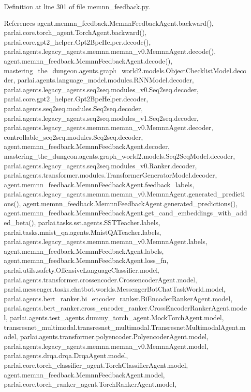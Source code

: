 Definition at line 301 of file memnn\+\_\+feedback.\+py.



References agent.\+memnn\+\_\+feedback.\+Memnn\+Feedback\+Agent.\+backward(), parlai.\+core.\+torch\+\_\+agent.\+Torch\+Agent.\+backward(), parlai.\+core.\+gpt2\+\_\+helper.\+Gpt2\+Bpe\+Helper.\+decode(), parlai.\+agents.\+legacy\+\_\+agents.\+memnn.\+memnn\+\_\+v0.\+Memnn\+Agent.\+decode(), agent.\+memnn\+\_\+feedback.\+Memnn\+Feedback\+Agent.\+decode(), mastering\+\_\+the\+\_\+dungeon.\+agents.\+graph\+\_\+world2.\+models.\+Object\+Checklist\+Model.\+decoder, parlai.\+agents.\+language\+\_\+model.\+modules.\+R\+N\+N\+Model.\+decoder, parlai.\+agents.\+legacy\+\_\+agents.\+seq2seq.\+modules\+\_\+v0.\+Seq2seq.\+decoder, parlai.\+core.\+gpt2\+\_\+helper.\+Gpt2\+Bpe\+Helper.\+decoder, parlai.\+agents.\+seq2seq.\+modules.\+Seq2seq.\+decoder, parlai.\+agents.\+legacy\+\_\+agents.\+seq2seq.\+modules\+\_\+v1.\+Seq2seq.\+decoder, parlai.\+agents.\+legacy\+\_\+agents.\+memnn.\+memnn\+\_\+v0.\+Memnn\+Agent.\+decoder, controllable\+\_\+seq2seq.\+modules.\+Seq2seq.\+decoder, agent.\+memnn\+\_\+feedback.\+Memnn\+Feedback\+Agent.\+decoder, mastering\+\_\+the\+\_\+dungeon.\+agents.\+graph\+\_\+world2.\+models.\+Seq2\+Seq\+Model.\+decoder, parlai.\+agents.\+legacy\+\_\+agents.\+seq2seq.\+modules\+\_\+v0.\+Ranker.\+decoder, parlai.\+agents.\+transformer.\+modules.\+Transformer\+Generator\+Model.\+decoder, agent.\+memnn\+\_\+feedback.\+Memnn\+Feedback\+Agent.\+feedback\+\_\+labels, parlai.\+agents.\+legacy\+\_\+agents.\+memnn.\+memnn\+\_\+v0.\+Memnn\+Agent.\+generated\+\_\+predictions(), agent.\+memnn\+\_\+feedback.\+Memnn\+Feedback\+Agent.\+generated\+\_\+predictions(), agent.\+memnn\+\_\+feedback.\+Memnn\+Feedback\+Agent.\+get\+\_\+cand\+\_\+embeddings\+\_\+with\+\_\+added\+\_\+beta(), parlai.\+tasks.\+sst.\+agents.\+S\+S\+T\+Teacher.\+labels, parlai.\+tasks.\+mnist\+\_\+qa.\+agents.\+Mnist\+Q\+A\+Teacher.\+labels, parlai.\+agents.\+legacy\+\_\+agents.\+memnn.\+memnn\+\_\+v0.\+Memnn\+Agent.\+labels, agent.\+memnn\+\_\+feedback.\+Memnn\+Feedback\+Agent.\+labels, agent.\+memnn\+\_\+feedback.\+Memnn\+Feedback\+Agent.\+loss\+\_\+fn, parlai.\+utils.\+safety.\+Offensive\+Language\+Classifier.\+model, parlai.\+agents.\+transformer.\+crossencoder.\+Crossencoder\+Agent.\+model, parlai.\+messenger.\+tasks.\+chatbot.\+worlds.\+Messenger\+Bot\+Chat\+Task\+World.\+model, parlai.\+agents.\+bert\+\_\+ranker.\+bi\+\_\+encoder\+\_\+ranker.\+Bi\+Encoder\+Ranker\+Agent.\+model, parlai.\+agents.\+bert\+\_\+ranker.\+cross\+\_\+encoder\+\_\+ranker.\+Cross\+Encoder\+Ranker\+Agent.\+model, parlai.\+agents.\+test\+\_\+agents.\+dummy\+\_\+torch\+\_\+agent.\+Mock\+Torch\+Agent.\+model, transresnet\+\_\+multimodal.\+transresnet\+\_\+multimodal.\+Transresnet\+Multimodal\+Agent.\+model, parlai.\+agents.\+transformer.\+polyencoder.\+Polyencoder\+Agent.\+model, parlai.\+agents.\+legacy\+\_\+agents.\+memnn.\+memnn\+\_\+v0.\+Memnn\+Agent.\+model, parlai.\+agents.\+drqa.\+drqa.\+Drqa\+Agent.\+model, parlai.\+core.\+torch\+\_\+classifier\+\_\+agent.\+Torch\+Classifier\+Agent.\+model, agent.\+memnn\+\_\+feedback.\+Memnn\+Feedback\+Agent.\+model, parlai.\+core.\+torch\+\_\+ranker\+\_\+agent.\+Torch\+Ranker\+Agent.\+model, 